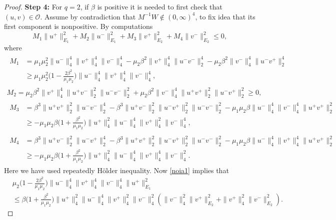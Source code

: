 \documentclass[reqno]{amsart}
\begin{document}
\begin{proof}
\noindent\textbf{Step 4:} For $q=2$,
if $\beta$ is positive it is needed to first check that $(u,v)\in \mathcal O$.
Assume by contradiction that $M^{-1}W \notin (0,\infty)^4$, to fix idea that its
first component is nonpositive. By computations
\begin{equation}\label{noia1}
 M_1 \|u^+\|_{E_1}^2 + M_2 \|u^-\|_{E_1}^2 + M_3 \|v^+\|_{E_2}^2
 + M_4  \|v^-\|_{E_2}^2 \le 0,
\end{equation}
where
\begin{gather*}
\begin{aligned}
M_1&=  \mu_1\mu_2^2 \|u^-\|_4^4\|v^+\|_4^4\|v^-\|_4^4
- \mu_2\beta^2\|v^+\|_4^4\|u^-v^-\|_2^4
- \mu_2\beta^2\|v^-\|_4^4\|u^-v^+\|_2^4  \\
&\ge  \mu_1\mu_2^2 \Big(1-\frac{2\beta^2}{\mu_1\mu_2} \Big)
 \|u^-\|_4^4\|v^+\|_4^4\|v^-\|_4^4 ,
\end{aligned} \\
M_2=  \mu_2\beta^2 \|v^+\|_4^4\|u^+v^-\|_2^2 \|u^-v^-\|_2^2
 + \mu_2\beta^2 \|v^-\|_4^4\|u^+v^+\|_2^2 \|u^-v^+\|_2^2 \ge 0 , \\
\begin{aligned}
M_3 &=  \beta^3 \|u^+v^+\|_2^2 \|u^-v^-\|_2^4 - \beta^3 \|u^+v^-\|_2^2
 \|u^-v^+\|_2^2\|u^-v^-\|_2^2 - \mu_1\mu_2\beta\|u^-\|_4^4\|v^-\|_4^4\|u^+v^+\|_2^2
\\
&\ge  - \mu_1\mu_2 {\beta}\Big(1+\frac{\beta^2}{\mu_1\mu_2}\Big)
 \|u^+\|_4^2\|u^-\|_4^4\|v^+\|_4^2\|v^-\|_4^4,
\end{aligned}\\
\begin{aligned}
 M_4 &=  \beta^3 \|u^+v^-\|_2^2 \|u^-v^+\|_2^4 - \beta^3
  \|u^+v^+\|_2^2 \|u^-v^+\|_2^2\|u^-v^-\|_2^2 - \mu_1\mu_2\beta\|u^-\|_4^4\|v^+
  \|_4^4\|u^+v^+\|_2^2
 \\
&\ge  - \mu_1\mu_2 {\beta}\Big(1+\frac{\beta^2}{\mu_1\mu_2}\Big)
 \|u^+\|_4^2\|u^-\|_4^4\|v^+\|_4^4\|v^-\|_4^2.
\end{aligned}
\end{gather*}
Here we have used repeatedly H\"older inequality. Now \eqref{noia1} implies that
\begin{equation}\label{noia2}
\begin{split}
&\mu_2 \Big(1-\frac{2\beta^2}{\mu_1\mu_2} \Big)
 \|u^-\|_4^4\|v^+\|_4^4\|v^-\|_4^4 \|u^+\|_{E_1}^2 \\
&\le   {\beta}\Big(1+\frac{\beta^2}{\mu_1\mu_2}\Big)
 \|u^+\|_4^2\|u^-\|_4^4\|v^+\|_4^2\|v^-\|_4^2
\left( \|v^-\|_4^2\|v^+\|_{E_2}^2 + \|v^+\|_4^2\|v^-\|_{E_2}^2 \right) .
\end{split}

\end{equation}
\end{proof}
\end{document}
